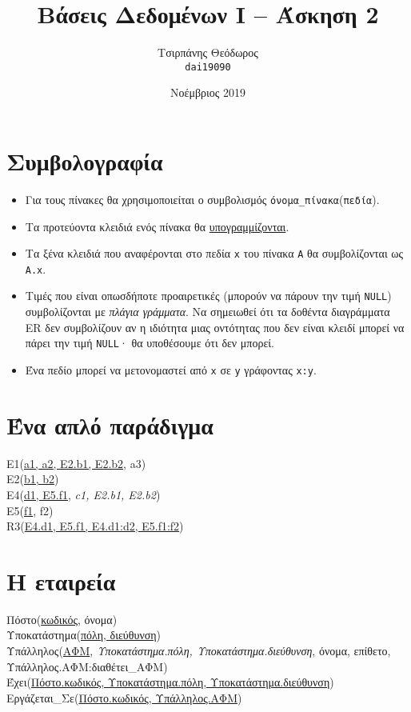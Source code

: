 \documentclass{article}
\title{Βάσεις Δεδομένων I -- Άσκηση 2}
\author{Τσιρπάνης Θεόδωρος\\ \texttt{dai19090}}
\date{Νοέμβριος 2019}
\begin{document}

\maketitle

\section*{Συμβολογραφία}

\begin{itemize}
\item Για τους πίνακες θα χρησιμοποιείται ο συμβολισμός \texttt{όνομα\_πίνακα}(\texttt{πεδία}).

\item Τα προτεύοντα κλειδιά ενός πίνακα θα \underline{υπογραμμίζονται}.

\item Τα ξένα κλειδιά που αναφέρονται στο πεδία \texttt{x} του πίνακα \texttt{A} θα συμβολίζονται ως \texttt{A.x}.

\item Τιμές που είναι οπωσδήποτε προαιρετικές (μπορούν να πάρουν την τιμή \texttt{NULL}) συμβολίζονται με \textit{πλάγια γράμματα}.
Να σημειωθεί ότι τα δοθέντα διαγράμματα ER δεν συμβολίζουν αν η ιδιότητα μιας οντότητας που δεν είναι κλειδί μπορεί να πάρει την τιμή \texttt{NULL}· θα υποθέσουμε ότι δεν μπορεί.

\item Ένα πεδίο μπορεί να μετονομαστεί από \texttt{x} σε \texttt{y} γράφοντας \texttt{x:y}.
\end{itemize}


\section{Ένα απλό παράδιγμα}

Ε1(\underline{a1, a2, E2.b1, E2.b2}, a3) \\
E2(\underline{b1, b2}) \\
E4(\underline{d1, E5.f1}, \textit{c1, E2.b1, E2.b2}) \\
E5(\underline{f1}, f2) \\
R3(\underline{E4.d1, E5.f1, E4.d1:d2, E5.f1:f2})

\section{Η εταιρεία}

Πόστο(\underline{κωδικός}, όνομα) \\
Υποκατάστημα(\underline{πόλη, διεύθυνση}) \\
Υπάλληλος(\underline{ΑΦΜ}, \textit{Υποκατάστημα.πόλη, Υποκατάστημα.διεύθυνση}, όνομα, επίθετο, Υπάλληλος.ΑΦΜ:διαθέτει\_ΑΦΜ) \\
Έχει(\underline{Πόστο.κωδικός, Υποκατάστημα.πόλη, Υποκατάστημα.διεύθυνση}) \\
Εργάζεται\_Σε(\underline{Πόστο.κωδικός, Υπάλληλος.ΑΦΜ})
\end{document}

